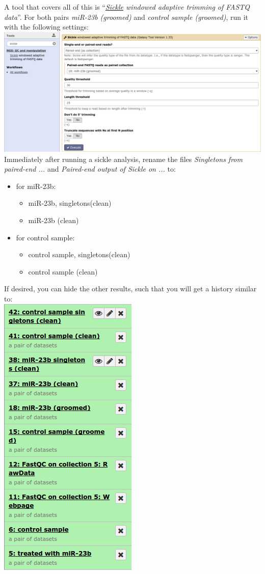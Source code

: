 A tool that covers all of this is ``\textit{\underline{Sickle} windowed adaptive trimming of FASTQ data}''. For both pairs \textit{miR-23b (groomed)} and \textit{control sample (groomed)}, run it with the following settings:\\
\includegraphics[width=\textwidth]{figures/qc_06.png}\\
Immediately after running a sickle analysis, rename the files 
\textit{Singletons from paired-end ...} and \textit{Paired-end output of Sickle on ...} to:
\begin{itemize}
	\item[] for miR-23b:
	\begin{itemize}
		\item miR-23b, singletons(clean)
		\item miR-23b (clean)
	\end{itemize}
	\item[] for control sample:
	\begin{itemize}
		\item control sample, singletons(clean)
		\item control sample (clean)
	\end{itemize}
\end{itemize}
If desired, you can hide the other results, such that you will get a history similar to:\\
\includegraphics[scale=0.55]{figures/qc_07.png}\\
